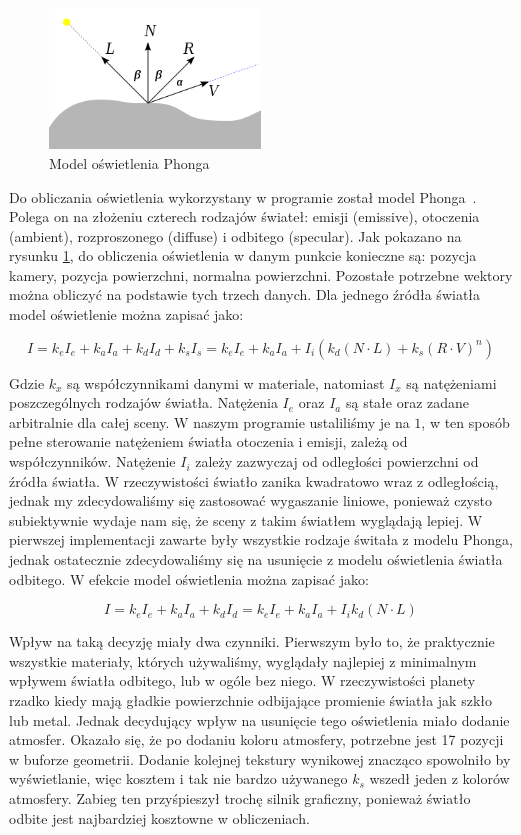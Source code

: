 \begin{figure}
\centering
	\includegraphics[width=0.5\textwidth]{img/phong.png}
\caption{Model oświetlenia Phonga}
\label{fig:phong}
\end{figure}

Do obliczania oświetlenia wykorzystany w programie został model Phonga~\cite{wiki:phong}. Polega on na złożeniu czterech rodzajów świateł: emisji (emissive), otoczenia (ambient), rozproszonego (diffuse) i odbitego (specular). Jak pokazano na rysunku \hyperref[fig:phong]{\ref*{fig:phong}}, do obliczenia oświetlenia w danym punkcie konieczne są: pozycja kamery, pozycja powierzchni, normalna powierzchni. Pozostałe potrzebne wektory można obliczyć na podstawie tych trzech danych. Dla jednego źródła światła model oświetlenie można zapisać jako:


$$ I = k_e I_e + k_a I_a + k_d I_d + k_s I_s = k_e I_e + k_a I_a + I_i( k_d( N \cdot L ) + k_s ( R \cdot V )^n ) $$

Gdzie $k_x$ są współczynnikami danymi w materiale, natomiast $I_x$ są natężeniami poszczególnych rodzajów światła. Natężenia $I_e$ oraz $I_a$ są stałe oraz zadane arbitralnie dla całej sceny. W naszym programie ustaliliśmy je na $1$, w ten sposób pełne sterowanie natężeniem światła otoczenia i emisji, zależą od współczynników. Natężenie $I_i$ zależy zazwyczaj od odległości powierzchni od źródła światła. W rzeczywistości światło zanika kwadratowo wraz z odległością, jednak my zdecydowaliśmy się zastosować wygaszanie liniowe, ponieważ czysto subiektywnie wydaje nam się, że sceny z takim światłem wyglądają lepiej. W pierwszej implementacji zawarte były wszystkie rodzaje świtała z modelu Phonga, jednak ostatecznie zdecydowaliśmy się na usunięcie z modelu oświetlenia światła odbitego. W efekcie model oświetlenia można zapisać jako:

$$ I = k_e I_e + k_a I_a + k_d I_d = k_e I_e + k_a I_a + I_i k_d( N \cdot L ) $$

Wpływ na taką decyzję miały dwa czynniki. Pierwszym było to, że praktycznie wszystkie materiały, których używaliśmy, wyglądały najlepiej z minimalnym wpływem światła odbitego, lub w ogóle bez niego. W rzeczywistości planety rzadko kiedy mają gładkie powierzchnie odbijające promienie światła jak szkło lub metal. Jednak decydujący wpływ na usunięcie tego oświetlenia miało dodanie atmosfer. Okazało się, że po dodaniu koloru atmosfery, potrzebne jest 17 pozycji w buforze geometrii. Dodanie kolejnej tekstury wynikowej znacząco spowolniło by wyświetlanie, więc kosztem i tak nie bardzo używanego $k_s$ wszedł jeden z kolorów atmosfery. Zabieg ten przyśpieszył trochę silnik graficzny, ponieważ światło odbite jest najbardziej kosztowne w obliczeniach.

